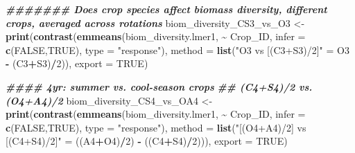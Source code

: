 \documentclass[
]{article}
\newenvironment{Shaded}{\begin{snugshade}}{\end{snugshade}}
\newcommand{\AttributeTok}[1]{\textcolor[rgb]{0.13,0.29,0.53}{#1}}
\newcommand{\ConstantTok}[1]{\textcolor[rgb]{0.56,0.35,0.01}{#1}}
\newcommand{\DecValTok}[1]{\textcolor[rgb]{0.00,0.00,0.81}{#1}}
\newcommand{\DocumentationTok}[1]{\textcolor[rgb]{0.56,0.35,0.01}{\textbf{\textit{#1}}}}
\newcommand{\FunctionTok}[1]{\textcolor[rgb]{0.13,0.29,0.53}{\textbf{#1}}}
\newcommand{\NormalTok}[1]{#1}
\newcommand{\OtherTok}[1]{\textcolor[rgb]{0.56,0.35,0.01}{#1}}
\newcommand{\SpecialCharTok}[1]{\textcolor[rgb]{0.81,0.36,0.00}{\textbf{#1}}}
\newcommand{\StringTok}[1]{\textcolor[rgb]{0.31,0.60,0.02}{#1}}
\begin{document}
\begin{Shaded}
\begin{Highlighting}[]
\DocumentationTok{\#\#\#\#\#\#\# Does crop species affect biomass diversity, different crops, averaged across rotations}
\NormalTok{biom\_diversity\_CS3\_vs\_O3 }\OtherTok{\textless{}{-}} \FunctionTok{print}\NormalTok{(}\FunctionTok{contrast}\NormalTok{(}\FunctionTok{emmeans}\NormalTok{(biom\_diversity.lmer1, }\SpecialCharTok{\textasciitilde{}}\NormalTok{ Crop\_ID,}
                                                   \AttributeTok{infer =} \FunctionTok{c}\NormalTok{(}\ConstantTok{FALSE}\NormalTok{,}\ConstantTok{TRUE}\NormalTok{), }
                                                   \AttributeTok{type =} \StringTok{"response"}\NormalTok{),}
                                           \AttributeTok{method =} \FunctionTok{list}\NormalTok{(}\StringTok{"O3 vs [(C3+S3)/2]"} \OtherTok{=}\NormalTok{ O3 }\SpecialCharTok{{-}}\NormalTok{ (C3}\SpecialCharTok{+}\NormalTok{S3)}\SpecialCharTok{/}\DecValTok{2}\NormalTok{)),}
                                  \AttributeTok{export =} \ConstantTok{TRUE}\NormalTok{)}

\DocumentationTok{\#\#\#\# 4yr: summer vs. cool{-}season crops}
\DocumentationTok{\#\# (C4+S4)/2 vs. (O4+A4)/2 }
\NormalTok{biom\_diversity\_CS4\_vs\_OA4 }\OtherTok{\textless{}{-}} \FunctionTok{print}\NormalTok{(}\FunctionTok{contrast}\NormalTok{(}\FunctionTok{emmeans}\NormalTok{(biom\_diversity.lmer1, }\SpecialCharTok{\textasciitilde{}}\NormalTok{ Crop\_ID,}
                                                    \AttributeTok{infer =} \FunctionTok{c}\NormalTok{(}\ConstantTok{FALSE}\NormalTok{,}\ConstantTok{TRUE}\NormalTok{),  }
                                                    \AttributeTok{type =} \StringTok{"response"}\NormalTok{),}
                                            \AttributeTok{method =} \FunctionTok{list}\NormalTok{(}\StringTok{"[(O4+A4)/2] vs [(C4+S4)/2]"} \OtherTok{=}
\NormalTok{                                                            ((A4}\SpecialCharTok{+}\NormalTok{O4)}\SpecialCharTok{/}\DecValTok{2}\NormalTok{) }\SpecialCharTok{{-}}\NormalTok{ ((C4}\SpecialCharTok{+}\NormalTok{S4)}\SpecialCharTok{/}\DecValTok{2}\NormalTok{))),}
                                   \AttributeTok{export =} \ConstantTok{TRUE}\NormalTok{)}


\end{Highlighting}
\end{Shaded}
\end{document}
